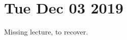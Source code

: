 \documentclass[main.tex]{subfiles}
\begin{document}
\section*{Tue Dec 03 2019}

Missing lecture, to recover.
\end{document}
